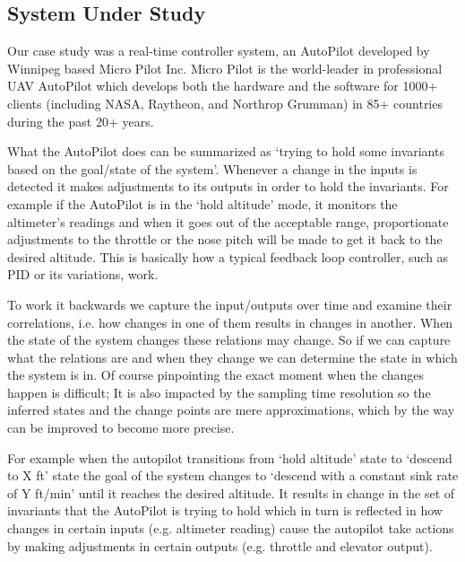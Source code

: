 \subsection{System Under Study} \label{mp_data_collection}

Our case study was a real-time controller system, an AutoPilot developed by Winnipeg based Micro Pilot Inc. Micro Pilot is the world-leader in professional UAV AutoPilot which develops both the hardware and the software for 1000+ clients (including NASA, Raytheon, and Northrop Grumman) in 85+ countries during the past 20+ years.

What the AutoPilot does can be summarized as `trying to hold some invariants based on the goal/state of the system'.
Whenever a change in the inputs is detected it makes adjustments to its outputs in order to hold the invariants. 
For example if the AutoPilot is in the `hold altitude' mode, it monitors the altimeter's readings and when it goes out of the acceptable range, proportionate adjustments to the throttle or the nose pitch will be made to get it back to the desired altitude. This is basically how a typical feedback loop controller, such as PID or its variations, work. \cite{feedbacksystemsBook}

\label{changes_in_inputs}
To work it backwards we capture the input/outputs over time and examine their correlations, i.e. how changes in one of them results in changes in another. When the state of the system changes these relations may change. So if we can capture what the relations are and when they change we can determine the state in which the system is in. 
Of course pinpointing the exact moment when the changes happen is difficult; It is also impacted by the sampling time resolution so the inferred states and the change points are mere approximations, which by the way can be improved to become more precise.

For example when the autopilot transitions from `hold altitude' state to `descend to X ft' state the goal of the system changes to `descend with a constant sink rate of Y ft/min' until it reaches the desired altitude. It results in change in the set of invariants that the AutoPilot is trying to hold which in turn is reflected in how changes in certain inputs (e.g. altimeter reading) cause the autopilot take actions by making adjustments in certain outputs (e.g. throttle and elevator output). 


